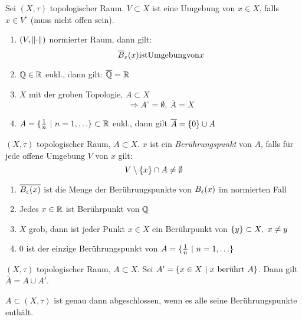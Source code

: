 \begin{dfn}
    Sei $(X,\tau)$ topologischer Raum. $V\subset X$ ist eine Umgebung von $x\in X$,
    falls $x\in V^\circ$ (muss nicht offen sein).

    \begin{bsp}
        \begin{enumerate}
            \item $(V,\norm{\cdot})$ normierter Raum, dann gilt:
                \[\overline{B}_\varepsilon(x) \mathrm{ ist Umgebung von } x\]
            \item $\mathbb{Q}\in \mathbb{R}$ eukl., dann gilt: $\overline{\mathbb{Q}}=\mathbb{R}$
            \item $X$ mit der groben Topologie, $A\subset X$
                \[\Rightarrow A^\circ = \emptyset,\ \overline{A} = X\]
            \item $A=\mdef[\frac{1}{n}]{n = 1, \ldots}\subset\R$ eukl., dann gilt
                $\overline{A} = \mdef{0} \cup A$
        \end{enumerate}
    \end{bsp}
\end{dfn}

\begin{dfn}
    $(X,\tau)$ topologischer Raum, $A\subset X$. $x$ ist ein \emph{Berührungspunkt}
    von $A$, falls für jede offene Umgebung $V$ von $x$ gilt:
    \[V\setminus \mdef{x}\cap A\neq \emptyset\]
    \begin{bsp}
        \begin{enumerate}
            \item $\overline{B_\varepsilon(x)}$ ist die Menge der Berührungspunkte von
                $B_\varepsilon(x)$ im normierten Fall
            \item Jedes $x\in\mathbb{R}$ ist Berührpunkt von $\mathbb{Q}$
            \item $X$ grob, dann ist jeder Punkt $x\in X$ ein Berührpunkt von
                $\mdef{y}\subset X,\ x\neq y$
            \item $0$ ist der einzige Berührungspunkt von
                $A=\mdef[\frac{1}{n}]{n=1,\ldots}$
        \end{enumerate}
    \end{bsp}
\end{dfn}

\begin{stz}
    $(X,\tau)$ topologischer Raum, $A\subset X$. Sei $A' = \mdef[x\in X]
    {x\text{ berührt } A}$. Dann gilt $\overline{A} = A\cup A'$.

    \begin{krl}
        $A\subset (X,\tau)$ ist genau dann abgeschlossen, wenn es alle seine
        Berührungspunkte enthält.
    \end{krl}
\end{stz}

